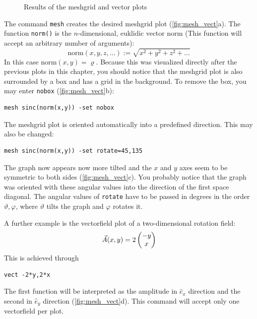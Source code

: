 \documentclass[DIV=14,headsepline,footsepline]{scrbook}
\begin{document}
\begin{figure}[p]
					\caption{Results of the meshgrid and vector plots}
					\label{fig:mesh_vect}
				\end{figure}
				The command \lstinline+mesh+ creates the desired meshgrid plot (\autoref{fig:mesh_vect}a). The function \lstinline+norm()+ is the $n$-dimensional, euklidic vector norm (This function will accept an arbitrary number of arguments):
				\begin{equation*}
					\text{norm}(x,y,z,\ldots) := \sqrt{x^2+y^2+z^2+\ldots}
				\end{equation*}
				In this case $\text{norm}(x,y) = \varrho$. Because this was visualized directly after the previous plots in this chapter, you should notice that the meshgrid plot is also surrounded by a box and has a grid in the background. To remove the box, you may enter \lstinline+nobox+ (\autoref{fig:mesh_vect}b):
				\begin{lstlisting}
mesh sinc(norm(x,y)) -set nobox
				\end{lstlisting}
				
				The meshgrid plot is oriented automatically into a predefined direction. This may also be changed:
				\begin{lstlisting}
mesh sinc(norm(x,y)) -set rotate=45,135
				\end{lstlisting}
				The graph now appears now more tilted and the $x$ and $y$ axes seem to be symmetric to both sides (\autoref{fig:mesh_vect}c). You probably notice that the graph was oriented with these angular values into the direction of the first space diagonal. The angular values of \lstinline+rotate+ have to be passed in degrees in the order $\vartheta,\varphi$, where $\vartheta$ tilts the graph and $\varphi$ rotates it.
				
				A further example is the vectorfield plot of a two-dimensional rotation field:
				\[\vec A(x,y) = 2\begin{pmatrix} -y\\x \end{pmatrix}\]
				This is achieved through
				\begin{lstlisting}
vect -2*y,2*x
				\end{lstlisting}
				The first function will be interpreted as the amplitude in $\hat e_x$ direction and the second in $\hat e_y$ direction (\autoref{fig:mesh_vect}d). This command will accept only one vectorfield per plot.
				
\end{document}
